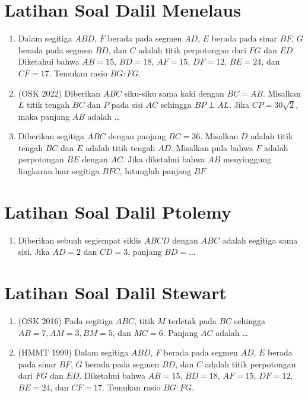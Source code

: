 \documentclass[12pt]{scrartcl}
\begin{document}
\section{Latihan Soal Dalil Menelaus}
\begin{enumerate}
    \item Dalam segitiga $ABD$, $F$ berada pada segmen $AD$, $E$ berada pada sinar $BF$, $G$ berada pada segmen $BD$, dan $C$ adalah titik perpotongan dari $FG$ dan $ED$. Diketahui bahwa $AB = 15$, $BD = 18$, $AF = 15$, $DF = 12$, $BE = 24$, dan $CF = 17$. Temukan rasio $BG : FG$.

    \item (OSK 2022) Diberikan $ABC$ siku-siku sama kaki dengan $BC=AB$. Misalkan $L$ titik tengah $BC$ dan $P$ pada sisi $AC$ sehingga $BP \perp AL$. Jika $CP=30\sqrt{2}$, maka panjang $AB$ adalah \ldots

    \item Diberikan segitiga $ABC$ dengan panjang $BC = 36$. Misalkan $D$ adalah titik tengah $BC$ dan $E$ adalah titik tengah $AD$. Misalkan pula bahwa $F$ adalah perpotongan $BE$ dengan $AC$. Jika diketahui bahwa $AB$ menyinggung lingkaran luar segitiga $BFC$, hitunglah panjang $BF$.
\end{enumerate}
\section{Latihan Soal Dalil Ptolemy}
\begin{enumerate}
    \item Diberikan sebuah segiempat siklis $ABCD$ dengan $ABC$ adalah segitiga sama sisi. Jika $AD=2$ dan $CD=3$, panjang $BD=\dots$
\end{enumerate}
\section{Latihan Soal Dalil Stewart}
\begin{enumerate}
    \item (OSK 2016) Pada segitiga $ABC$, titik $M$ terletak pada $BC$ sehingga $AB=7, AM=3, BM=5$, dan $MC=6$. Panjang $AC$ adalah \dots

    \item (HMMT 1999) Dalam segitiga $ABD$, $F$ berada pada segmen $AD$, $E$ berada pada sinar $BF$, $G$ berada pada segmen $BD$, dan $C$ adalah titik perpotongan dari $FG$ dan $ED$. Diketahui bahwa $AB = 15$, $BD = 18$, $AF = 15$, $DF = 12$, $BE = 24$, dan $CF = 17$. Temukan rasio $BG : FG$.
\end{enumerate}
\end{document}
